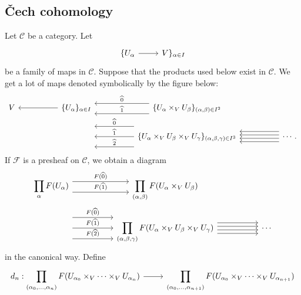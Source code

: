 \documentclass [11 pt, oneside] {article}
\begin{document}
\subsection{\v Cech cohomology}
Let $\mathscr{C}$ be a category. Let
\[
\begin{tikzcd}
	\{U_{\alpha}\ar[r] & V\}_{\alpha\in I}
\end{tikzcd}
\]
be a family of maps in $\mathscr{C}$.
Suppose that the products used below exist in $\mathscr{C}$.
We get a lot of maps denoted symbolically by the figure below:
\[
\begin{tikzcd}[column sep = 5 em]
V& \{U_{\alpha}\}_{\alpha\in I}\ar[l] & \{U_{\alpha}\times _{V}U_{\beta}\}_{(\alpha,\beta)\in I ^{2}} \ar[l,shift left = 1.7 ex, "\widehat{1}",swap] \ar[l,shift right = 1.3 ex, "\widehat{0}",swap]\\
         &\phantom{\{U_{\alpha}\}_{\alpha\in I}}&\{U_{\alpha}\times_{V}U_{\beta}\times_{V}U_{\gamma}\} _{(\alpha,\beta,\gamma)\in I^{3}}\ar[l, shift right = 3 ex, "\widehat{0}",swap] \ar[l, "\widehat{1}",swap] \ar[l, shift left = 3 ex, "\widehat{2}",swap] & \cdots.\ar[l,shift left = 1.5 ex] \ar[l, shift left = 0.5 ex] \ar[l, shift right = 0.5 ex] \ar[l, shift right = 1.5 ex]
         \end{tikzcd} 
\]
If $\mathscr{F}$ is a presheaf on $\mathscr{C}$, we obtain a diagram
\[
\begin{tikzcd}[column sep = 5 em]
\displaystyle \prod_\alpha \mathscr{F}(U_\alpha) \ar[r,shift right = 1.7 ex, "\mathscr{F}(\widehat{1})"] \ar[r,shift left = 1.3 ex, "\mathscr{F}(\widehat{0})"] & \displaystyle \prod_{(\alpha,\beta)} \mathscr{F}(U_\alpha\times_V U_\beta)\\
\phantom{\displaystyle \prod_\alpha \mathscr{F}(U_\alpha)}\ar[r, shift left = 3 ex, "\mathscr{F}(\widehat{0})",] \ar[r, "\mathscr{F}(\widehat{1})",] \ar[r, shift right = 3 ex, "\mathscr{F}(\widehat{2})",] &\displaystyle \prod_{(\alpha,\beta,\gamma)} \mathscr{F}(U_\alpha\times_VU_\beta\times_VU_\gamma) \ar[r,shift left = 1.5 ex] \ar[r, shift left = 0.5 ex] \ar[r, shift right = 0.5 ex] \ar[r, shift right = 1.5 ex]&\cdots
\end{tikzcd}
\]
in the canonical way. Define
\[
\begin{tikzcd}
	d_n : \displaystyle \prod_{(\alpha_0,\hdots,\alpha_{n})} \mathscr{F}(U_{\alpha_0} \times_{V} \cdots\times_{V} U_{\alpha_{n}}) \ar[r]& \displaystyle\prod_{(\alpha_0,\hdots, \alpha_{n+1})} \mathscr{F}(U_{\alpha_0}\times_{V}\cdots \times_{V}U_{\alpha_{n+1}}) 
\end{tikzcd}
\]
\end{document}
